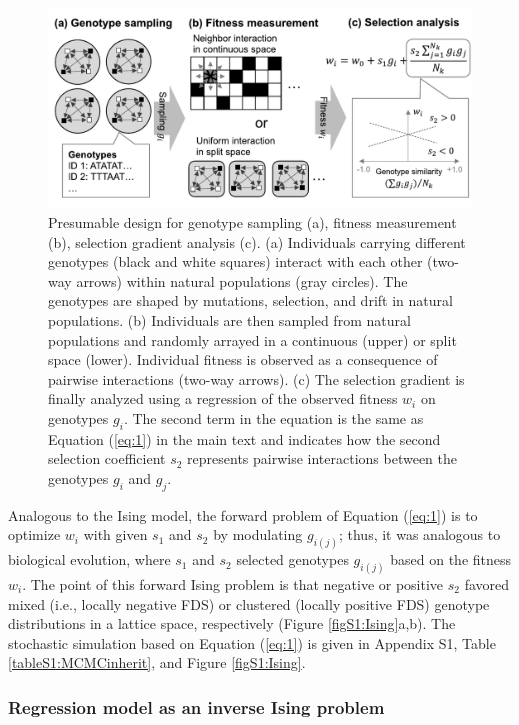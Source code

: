 \documentclass[12pt,]{article}
\begin{document}
\begin{figure}[ht]
  \includegraphics[width=\linewidth]{scheme.pdf}
  \caption{Presumable design for genotype sampling (a), fitness measurement (b), selection gradient analysis (c). (a) Individuals carrying different genotypes (black and white squares) interact with each other (two-way arrows) within natural populations (gray circles). The genotypes are shaped by mutations, selection, and drift in natural populations. (b) Individuals are then sampled from natural populations and randomly arrayed in a continuous (upper) or split space (lower). Individual fitness is observed as a consequence of pairwise interactions (two-way arrows). (c) The selection gradient is finally analyzed using a regression of the observed fitness $w_i$ on genotypes $g_i$. The second term in the equation is the same as Equation (\ref{eq:1}) in the main text and indicates how the second selection coefficient $s_2$ represents pairwise interactions between the genotypes $g_i$ and $g_j$.
}
  \label{fig1:scheme}
\end{figure}

Analogous to the Ising model, the forward problem of Equation (\ref{eq:1}) is to optimize $w_i$ with given $s_1$ and $s_2$ by modulating $g_{i(j)}$; thus, it was analogous to biological evolution, where $s_1$ and $s_2$ selected genotypes $g_{i(j)}$ based on the fitness $w_i$. The point of this forward Ising problem is that negative or positive $s_2$ favored mixed (i.e., locally negative FDS) or clustered (locally positive FDS) genotype distributions in a lattice space, respectively (Figure \ref{figS1:Ising}a,b). The stochastic simulation based on Equation (\ref{eq:1}) is given in Appendix S1, Table \ref{tableS1:MCMCinherit}, and Figure \ref{figS1:Ising}.


\subsubsection{Regression model as an inverse Ising problem}
\end{document}
